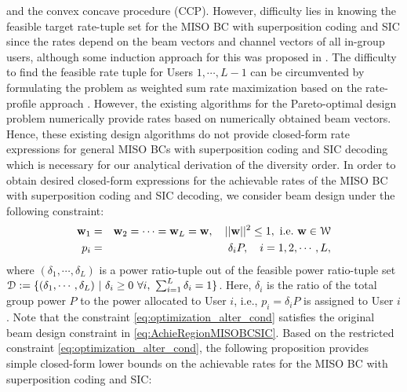 \documentclass[11pt, draft, onecolumn ]{IEEEtran}
\begin{document}
 and the convex concave procedure (CCP)\cite{yuille03:Concave}.
However, difficulty lies in knowing  the feasible target rate-tuple set for the MISO BC with superposition coding and SIC
since the rates depend on the beam vectors and channel vectors of all in-group users, although some induction approach for this  was proposed in \cite{Seo&Sung:18SP}.
{}{The difficulty to find the feasible rate tuple for Users $1,\cdots,L-1$ can be circumvented by formulating the problem as weighted sum rate maximization  based on the rate-profile approach \cite{Zhang&Cui:10SP}. However,} the existing algorithms for the Pareto-optimal design problem  numerically provide rates  based on numerically obtained beam vectors. Hence, these existing design algorithms do not provide  closed-form rate expressions for general MISO BCs with superposition coding and SIC decoding which is necessary for our analytical derivation of the diversity order.
In order {}{to obtain desired closed-form expressions} for  the achievable rates of the  MISO BC with superposition coding and SIC decoding, we consider beam design under the following constraint:
\begin{eqnarray}
{\bf w}_1&=&{\bf w}_2=\cdots={\bf w}_L= {\bf w},~~~||{\bf w}||^2 \le 1, ~\mbox{i.e.}~{\bf w} \in {\cal W} \nonumber\\
p_i &=& \delta_i P, ~~~i=1,2,\cdots,L, \label{eq:optimization_alter_cond}
\end{eqnarray}
where $(\delta_1, \cdots, \delta_L)$ is a power ratio-tuple out of
the feasible power ratio-tuple set
${\cal D}:=\{ (\delta_1, \cdots, \delta_L) ~ | ~ \delta_i \ge 0~ \forall i, ~\sum_{i=1}^L \delta_i = 1\}$.
Here, $\delta_i$ is the ratio of the total group power $P$ to the power allocated to
User $i$, i.e., $p_i=\delta_iP$ is assigned to User $i$.  Note that the   constraint \eqref{eq:optimization_alter_cond}
satisfies the original beam design constraint in  \eqref{eq:AchieRegionMISOBCSIC}.
 Based on the restricted  constraint \eqref{eq:optimization_alter_cond},
 the following proposition provides simple closed-form lower bounds on the achievable rates  for
the MISO BC with superposition coding and SIC:
\end{document}

